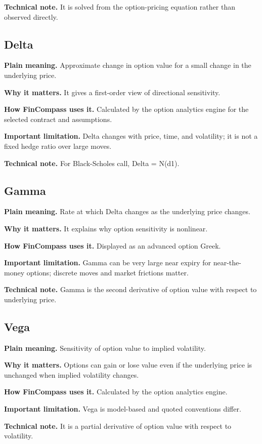 \documentclass[11pt]{article}
\begin{document}
\textbf{Technical note.} It is solved from the option-pricing equation rather than observed directly.

\subsection{Delta}
\textbf{Plain meaning.} Approximate change in option value for a small change in the underlying price.

\textbf{Why it matters.} It gives a first-order view of directional sensitivity.

\textbf{How FinCompass uses it.} Calculated by the option analytics engine for the selected contract and assumptions.

\textbf{Important limitation.} Delta changes with price, time, and volatility; it is not a fixed hedge ratio over large moves.

\textbf{Technical note.} For Black-Scholes call, Delta = N(d1).

\subsection{Gamma}
\textbf{Plain meaning.} Rate at which Delta changes as the underlying price changes.

\textbf{Why it matters.} It explains why option sensitivity is nonlinear.

\textbf{How FinCompass uses it.} Displayed as an advanced option Greek.

\textbf{Important limitation.} Gamma can be very large near expiry for near-the-money options; discrete moves and market frictions matter.

\textbf{Technical note.} Gamma is the second derivative of option value with respect to underlying price.

\subsection{Vega}
\textbf{Plain meaning.} Sensitivity of option value to implied volatility.

\textbf{Why it matters.} Options can gain or lose value even if the underlying price is unchanged when implied volatility changes.

\textbf{How FinCompass uses it.} Calculated by the option analytics engine.

\textbf{Important limitation.} Vega is model-based and quoted conventions differ.

\textbf{Technical note.} It is a partial derivative of option value with respect to volatility.
\end{document}
